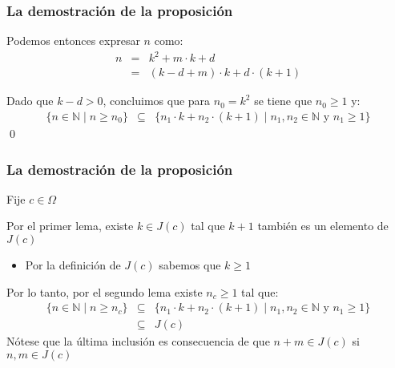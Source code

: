 \begin{frame}
\frametitle{La demostración de la proposición}

{\small

Podemos entonces expresar $n$ como:
\begin{eqnarray*}
n &=& k^2 + m \cdot k + d\\
& = & (k - d + m)\cdot k + d \cdot (k + 1)
\end{eqnarray*}


Dado que $k - d > 0$, concluimos que para $n_0 = k^2$ se tiene que $n_0 \geq 1$ y:
\begin{eqnarray*}
\{ n \in \mathbb{N} \mid n \geq n_0\} & \subseteq & \{ n_1 \cdot k + n_2 \cdot (k + 1) \mid n_1, n_2 \in \mathbb{N} \text{ y } n_1 \geq 1 \} 
\end{eqnarray*} \qed


}

\end{frame}

\begin{frame}
\frametitle{La demostración de la proposición}

{\small

Fije $c \in \Omega$


Por el primer lema, existe $k \in J(c)$ tal que $k + 1$ también es un elemento de $J(c)$
\begin{itemize}
\item Por la definición de $J(c)$ sabemos que $k \geq 1$
\end{itemize}


Por lo tanto, por el segundo lema existe $n_c \geq 1$ tal que:
\begin{eqnarray*}
\{ n \in \mathbb{N} \mid n \geq n_c\} & \subseteq & \{ n_1 \cdot k + n_2 \cdot (k + 1) \mid n_1, n_2 \in \mathbb{N} \text{ y } n_1 \geq 1\} \\
&\subseteq& J(c)
\end{eqnarray*}
Nótese que la última inclusión es consecuencia de que $n + m \in J(c)$ si~$n,m \in J(c)$

}

\end{frame}

